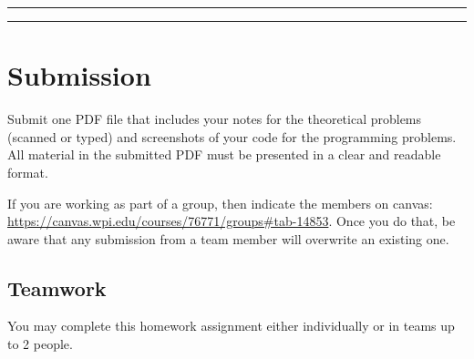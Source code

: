 \documentclass[
  letterpaper,
  DIV=11,
  numbers=noendperiod]{scrartcl}
\begin{document}
\begin{center}\rule{0.5\linewidth}{0.5pt}\end{center}

\begin{center}\rule{0.5\linewidth}{0.5pt}\end{center}

\section{Submission}\label{submission}

Submit one PDF file that includes your notes for the theoretical
problems (scanned or typed) and screenshots of your code for the
programming problems. All material in the submitted PDF must be
presented in a clear and readable format.

If you are working as part of a group, then indicate the members on
canvas:
\href{https://www.google.com/search?q=https://canvas.wpi.edu/courses/76771/groups\%23tab-14853}{https://canvas.wpi.edu/courses/76771/groups\#tab-14853}.
Once you do that, be aware that any submission from a team member will
overwrite an existing one.

\subsection{Teamwork}\label{teamwork}

You may complete this homework assignment either individually or in
teams up to 2 people.
\end{document}
